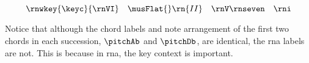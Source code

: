 \begin{equation}
    \label{eq:succession2}
    \rnwkey{\keyc}{\rnVI} \quad \musFlat{}\rn{II} \quad \rnV\rnseven \quad \rni
\end{equation}

Notice that although the chord labels and note arrangement
of the first two chords in each succession, $\pitchAb$ and
$\pitchDb$, are identical, the \gls{rna} labels are not.
This is because in \gls{rna}, the key context is important.


